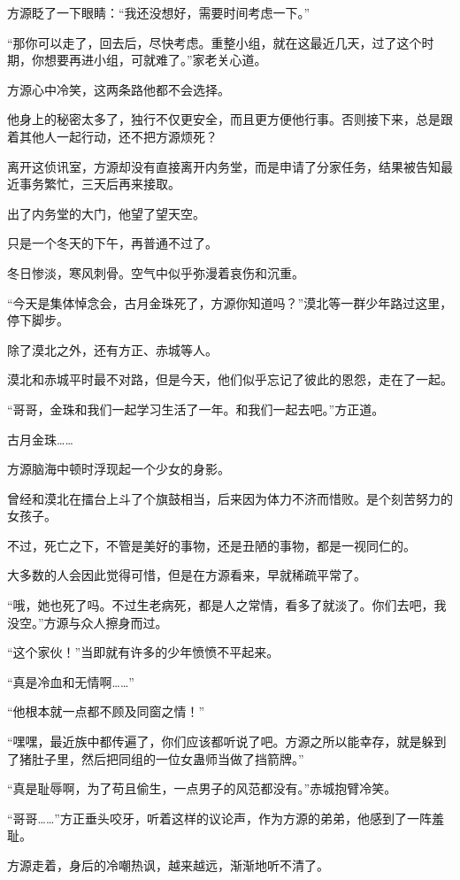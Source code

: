 \begin{this_body}
方源眨了一下眼睛：“我还没想好，需要时间考虑一下。”

“那你可以走了，回去后，尽快考虑。重整小组，就在这最近几天，过了这个时期，你想要再进小组，可就难了。”家老关心道。

方源心中冷笑，这两条路他都不会选择。

他身上的秘密太多了，独行不仅更安全，而且更方便他行事。否则接下来，总是跟着其他人一起行动，还不把方源烦死？

离开这侦讯室，方源却没有直接离开内务堂，而是申请了分家任务，结果被告知最近事务繁忙，三天后再来接取。

出了内务堂的大门，他望了望天空。

只是一个冬天的下午，再普通不过了。

冬日惨淡，寒风刺骨。空气中似乎弥漫着哀伤和沉重。

“今天是集体悼念会，古月金珠死了，方源你知道吗？”漠北等一群少年路过这里，停下脚步。

除了漠北之外，还有方正、赤城等人。

漠北和赤城平时最不对路，但是今天，他们似乎忘记了彼此的恩怨，走在了一起。

“哥哥，金珠和我们一起学习生活了一年。和我们一起去吧。”方正道。

古月金珠……

方源脑海中顿时浮现起一个少女的身影。

曾经和漠北在擂台上斗了个旗鼓相当，后来因为体力不济而惜败。是个刻苦努力的女孩子。

不过，死亡之下，不管是美好的事物，还是丑陋的事物，都是一视同仁的。

大多数的人会因此觉得可惜，但是在方源看来，早就稀疏平常了。

“哦，她也死了吗。不过生老病死，都是人之常情，看多了就淡了。你们去吧，我没空。”方源与众人擦身而过。

“这个家伙！”当即就有许多的少年愤愤不平起来。

“真是冷血和无情啊……”

“他根本就一点都不顾及同窗之情！”

“嘿嘿，最近族中都传遍了，你们应该都听说了吧。方源之所以能幸存，就是躲到了猪肚子里，然后把同组的一位女蛊师当做了挡箭牌。”

“真是耻辱啊，为了苟且偷生，一点男子的风范都没有。”赤城抱臂冷笑。

“哥哥……”方正垂头咬牙，听着这样的议论声，作为方源的弟弟，他感到了一阵羞耻。

方源走着，身后的冷嘲热讽，越来越远，渐渐地听不清了。


\end{this_body}
